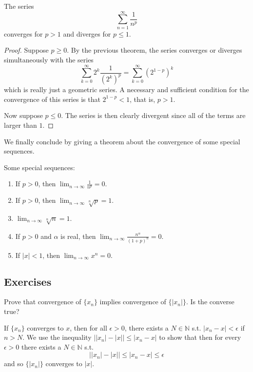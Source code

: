 \documentclass{article}
\begin{document}
    \begin{corollary}
    The series 
    \[\sum_{n=1}^\infty \frac{1}{n^p}\]
    converges for $p>1$ and diverges for $p \leq 1$. 
    \end{corollary}
    \begin{proof}
    Suppose $p\geq 0$. By the previous theorem, the series converges or diverges simultaneously with the series 
    \[\sum_{k=0}^\infty 2^k \frac{1}{(2^k)^p} = \sum_{k=0}^\infty (2^{1-p})^k\]
    which is really just a geometric series. A necessary and sufficient condition for the convergence of this series is that $2^{1-p} < 1$, that is, $p>1$. 

    Now suppose $p \leq 0$. The series is then clearly divergent since all of the terms are larger than $1$. 
    \end{proof}

    We finally conclude by giving a theorem about the convergence of some special sequences. 

    \begin{theorem}
      Some special sequences: 
      \begin{enumerate}
        \item If $p > 0$, then $\lim_{n \rightarrow \infty} \frac{1}{n^p} = 0$. 
        
        \item If $p > 0$, then $\lim_{n \rightarrow \infty} \sqrt[n]{p} = 1$. 

        \item $\lim_{n \rightarrow \infty} \sqrt[n]{n} = 1$. 

        \item If $p > 0$ and $\alpha$ is real, then $\lim_{n \rightarrow \infty} \frac{n^\alpha}{(1 + p)^n} = 0$. 
        
        \item If $|x| < 1$, then $\lim_{n \rightarrow \infty} x^n = 0$. 
      \end{enumerate}
    \end{theorem}

  \subsection{Exercises}

    \begin{exercise}
    Prove that convergence of $\{x_n\}$ implies convergence of $\{|x_n|\}$. Is the converse true? 
    \end{exercise}
    \begin{solution}
    If $\{x_n\}$ converges to $x$, then for all $\epsilon > 0$, there exists a $N \in \mathbb{N}$ s.t. $|x_n - x| < \epsilon$ if $n > N$. We use the inequality $\big| |x_n| - |x| \big| \leq |x_n - x|$ to show that then for every $\epsilon > 0$ there exists a $N \in \mathbb{N}$ s.t. 
    \[ \big| |x_n| - |x| \big| \leq |x_n - x| \leq \epsilon \]
    and so $\{|x_n|\}$ converges to $|x|$. 
    \end{solution}
\end{document}
